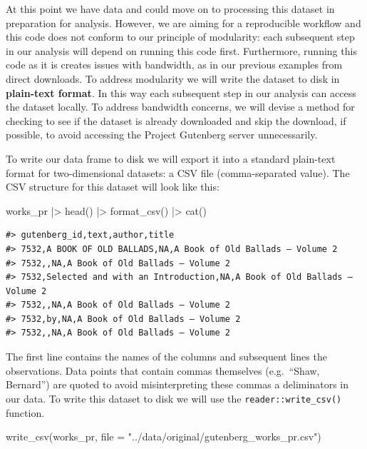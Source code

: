 \documentclass[
  letterpaper,
]{latex/krantz}
\newenvironment{Shaded}{\begin{snugshade}}{\end{snugshade}}
\newcommand{\AttributeTok}[1]{\textcolor[rgb]{0.40,0.45,0.13}{#1}}
\newcommand{\FunctionTok}[1]{\textcolor[rgb]{0.28,0.35,0.67}{#1}}
\newcommand{\NormalTok}[1]{\textcolor[rgb]{0.00,0.23,0.31}{#1}}
\newcommand{\SpecialCharTok}[1]{\textcolor[rgb]{0.37,0.37,0.37}{#1}}
\newcommand{\StringTok}[1]{\textcolor[rgb]{0.13,0.47,0.30}{#1}}
\begin{document}
At this point we have data and could move on to processing this dataset
in preparation for analysis. However, we are aiming for a reproducible
workflow and this code does not conform to our principle of modularity:
each subsequent step in our analysis will depend on running this code
first. Furthermore, running this code as it is creates issues with
bandwidth, as in our previous examples from direct downloads. To address
modularity we will write the dataset to disk in \textbf{plain-text
format}. In this way each subsequent step in our analysis can access the
dataset locally. To address bandwidth concerns, we will devise a method
for checking to see if the dataset is already downloaded and skip the
download, if possible, to avoid accessing the Project Gutenberg server
unnecessarily.

To write our data frame to disk we will export it into a standard
plain-text format for two-dimensional datasets: a CSV file
(comma-separated value). The CSV structure for this dataset will look
like this:

\begin{Shaded}
\begin{Highlighting}[]
\NormalTok{works\_pr }\SpecialCharTok{|\textgreater{}} \FunctionTok{head}\NormalTok{() }\SpecialCharTok{|\textgreater{}} \FunctionTok{format\_csv}\NormalTok{() }\SpecialCharTok{|\textgreater{}} \FunctionTok{cat}\NormalTok{()}
\end{Highlighting}
\end{Shaded}

\begin{verbatim}
#> gutenberg_id,text,author,title
#> 7532,A BOOK OF OLD BALLADS,NA,A Book of Old Ballads — Volume 2
#> 7532,,NA,A Book of Old Ballads — Volume 2
#> 7532,Selected and with an Introduction,NA,A Book of Old Ballads — Volume 2
#> 7532,,NA,A Book of Old Ballads — Volume 2
#> 7532,by,NA,A Book of Old Ballads — Volume 2
#> 7532,,NA,A Book of Old Ballads — Volume 2
\end{verbatim}

The first line contains the names of the columns and subsequent lines
the observations. Data points that contain commas themselves
(e.g.~``Shaw, Bernard'') are quoted to avoid misinterpreting these
commas a deliminators in our data. To write this dataset to disk we will
use the \texttt{reader::write\_csv()} function.

\begin{Shaded}
\begin{Highlighting}[]
\FunctionTok{write\_csv}\NormalTok{(works\_pr, }\AttributeTok{file =} \StringTok{"../data/original/gutenberg\_works\_pr.csv"}\NormalTok{)}
\end{Highlighting}
\end{Shaded}
\end{document}
